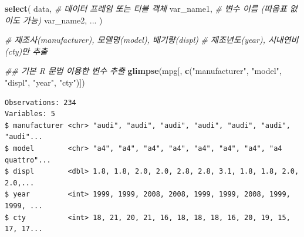 \documentclass[
  11pt,
]{krantz}
\newenvironment{Shaded}{\begin{snugshade}}{\end{snugshade}}
\newcommand{\CommentTok}[1]{\textcolor[rgb]{0.37,0.37,0.37}{\textit{#1}}}
\newcommand{\KeywordTok}[1]{\textcolor[rgb]{0.27,0.27,0.27}{\textbf{#1}}}
\newcommand{\NormalTok}[1]{#1}
\newcommand{\OperatorTok}[1]{\textcolor[rgb]{0.43,0.43,0.43}{\textbf{#1}}}
\newcommand{\StringTok}[1]{\textcolor[rgb]{0.5,0.5,0.5}{#1}}
\begin{document}
\normalsize

\footnotesize

\begin{Shaded}
\begin{Highlighting}[]
\KeywordTok{select}\NormalTok{(}
\NormalTok{  data, }\CommentTok{# 데이터 프레임 또는 티블 객체}
\NormalTok{  var_name1, }\CommentTok{# 변수 이름 (따옴표 없이도 가능)}
\NormalTok{  var_name2, }
\NormalTok{  ...}
\NormalTok{)}
\end{Highlighting}
\end{Shaded}

\normalsize

\footnotesize

\begin{Shaded}
\begin{Highlighting}[]
\CommentTok{# 제조사(manufacturer), 모델명(model), 배기량(displ)}
\CommentTok{# 제조년도(year), 시내연비 (cty)만 추출}

\CommentTok{## 기본 R 문법 이용한 변수 추출}
\KeywordTok{glimpse}\NormalTok{(mpg[, }\KeywordTok{c}\NormalTok{(}\StringTok{"manufacturer"}\NormalTok{, }\StringTok{"model"}\NormalTok{, }\StringTok{"displ"}\NormalTok{, }\StringTok{"year"}\NormalTok{, }\StringTok{"cty"}\NormalTok{)])}
\end{Highlighting}
\end{Shaded}

\begin{verbatim}
Observations: 234
Variables: 5
$ manufacturer <chr> "audi", "audi", "audi", "audi", "audi", "audi", "audi"...
$ model        <chr> "a4", "a4", "a4", "a4", "a4", "a4", "a4", "a4 quattro"...
$ displ        <dbl> 1.8, 1.8, 2.0, 2.0, 2.8, 2.8, 3.1, 1.8, 1.8, 2.0, 2.0,...
$ year         <int> 1999, 1999, 2008, 2008, 1999, 1999, 2008, 1999, 1999, ...
$ cty          <int> 18, 21, 20, 21, 16, 18, 18, 18, 16, 20, 19, 15, 17, 17...
\end{verbatim}

\begin{Shaded}
\end{Shaded}
\end{document}
